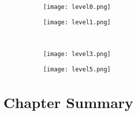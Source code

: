\begin{figure}
  \centering
  \begin{subfigure}[t]{0.48\textwidth}
    \centering
    \texttt{[image: level0.png]}
    \caption{\label{fig:}}
  \end{subfigure}
  \hfill
  \begin{subfigure}[t]{0.48\textwidth}
    \centering
    \texttt{[image: level1.png]}
    \caption{\label{fig:}}
  \end{subfigure}
  \\
  \begin{subfigure}[t]{0.48\textwidth}
    \centering
    \texttt{[image: level3.png]}
    \caption{\label{fig:}}
  \end{subfigure}
  \begin{subfigure}[t]{0.48\textwidth}
    \centering
    \texttt{[image: level5.png]}
    \caption{\label{fig:}}
  \end{subfigure}
  \caption{\label{fig:}}
\end{figure}


\section{Chapter Summary}

